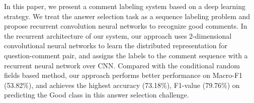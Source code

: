 In this paper, we present a comment labeling system based on a deep learning strategy. We treat the answer selection task as a sequence labeling problem and propose recurrent convolution neural networks to recognize good comments. In the recurrent architecture of our system, our approach uses 2-dimensional convolutional neural networks to learn the distributed representation for question-comment pair, and assigns the labels to the comment sequence with a recurrent neural network over CNN. Compared with the conditional random fields based method, our approach performs better performance on Macro-F1 (53.82\%), and achieves the highest accuracy (73.18\%), F1-value (79.76\%) on predicting the Good class in this answer selection challenge.
